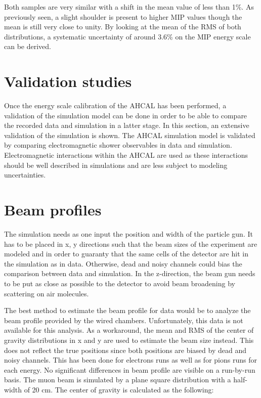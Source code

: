 Both samples are very similar with a shift in the mean value of less than 1\%. As previously seen, a slight shoulder is present to higher MIP values though the mean is still very close to unity. By looking at the mean of the RMS of both distributions, a systematic uncertainty of around 3.6\% on the MIP energy scale can be derived.

\section{Validation studies}
\label{appendix:SimulationVal}

Once the energy scale calibration of the AHCAL has been performed, a validation of the simulation model can be done in order to be able to compare the recorded data and simulation in a latter stage.
In this section, an extensive validation of the simulation is shown. The AHCAL simulation model is validated by comparing electromagnetic shower observables in data and simulation. Electromagnetic interactions within the AHCAL are used as these interactions should be well described in simulations and are less subject to modeling uncertainties.

\section{Beam profiles}

The simulation needs as one input the position and width of the particle gun. It has to be placed in x, y directions such that the beam sizes of the experiment are modeled and in order to guaranty that the same cells of the detector are hit in the simulation as in data. Otherwise, dead and noisy channels could bias the comparison between data and simulation. In the z-direction, the beam gun needs to be put as close as possible to the detector to avoid beam broadening by scattering on air molecules.

The best method to estimate the beam profile for data would be to analyze the beam profile provided by the wired chambers. Unfortunately, this data is not available for this analysis. As a workaround, the mean and RMS of the center of gravity distributions in x and y are used to estimate the beam size instead. This does not reflect the true positions since both positions are biased by dead and noisy channels. This has been done for electrons runs as well as for pions runs for each energy. No significant differences in beam profile are visible on a run-by-run basis. The muon beam is simulated by a plane square distribution with a half-width of 20 cm. The center of gravity is calculated as the following:

